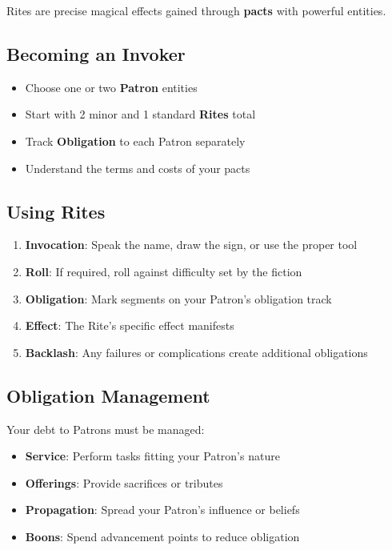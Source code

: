 \begin{multicols}{2}
Rites are precise magical effects gained through \textbf{pacts} with powerful entities.

\subsection*{Becoming an Invoker}
\begin{itemize}
\item Choose one or two \textbf{Patron} entities
\item Start with 2 minor and 1 standard \textbf{Rites} total
\item Track \textbf{Obligation} to each Patron separately
\item Understand the terms and costs of your pacts
\end{itemize}

\subsection*{Using Rites}
\begin{enumerate}
\item \textbf{Invocation}: Speak the name, draw the sign, or use the proper tool
\item \textbf{Roll}: If required, roll against difficulty set by the fiction
\item \textbf{Obligation}: Mark segments on your Patron's obligation track
\item \textbf{Effect}: The Rite's specific effect manifests
\item \textbf{Backlash}: Any failures or complications create additional obligations
\end{enumerate}

\subsection*{Obligation Management}
Your debt to Patrons must be managed:
\begin{itemize}
\item \textbf{Service}: Perform tasks fitting your Patron's nature
\item \textbf{Offerings}: Provide sacrifices or tributes
\item \textbf{Propagation}: Spread your Patron's influence or beliefs
\item \textbf{Boons}: Spend advancement points to reduce obligation
\end{itemize}


\end{multicols}
